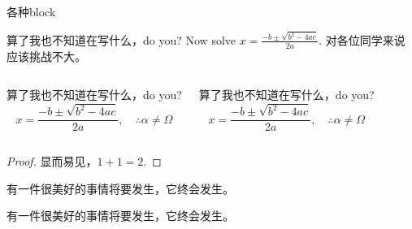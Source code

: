 \documentclass[aspectratio=1610,linespread=1.4,t]{ctexbeamer}
\begin{document}

\begin{frame}[allowframebreaks]{各种block}
    
    \begin{exampleblock}{算了我也不知道在写什么，do you?}
    Now solve $x = \frac{-b \pm \sqrt{b^2 -4ac}}{2a}$. 对各位同学来说应该挑战不大。
    \end{exampleblock}

\begin{columns}[T]
    \begin{alertblock}{算了我也不知道在写什么，do you?}
    \[ x = \frac{-b \pm \sqrt{b^2 -4ac}}{2a}, \quad\therefore \alpha \neq \Omega \]
    \end{alertblock}
    
    \begin{block}{算了我也不知道在写什么，do you?}
    \[ x = \frac{-b \pm \sqrt{b^2 -4ac}}{2a}, \quad\therefore \alpha \neq \Omega \]
    \end{block}
\end{columns}
    
    \begin{proof}
    显而易见，$1+1=2$.
    \end{proof}

    \begin{theorem}
    有一件很美好的事情将要发生，它终会发生。
    \end{theorem}
    
    \begin{definition}
    有一件很美好的事情将要发生，它终会发生。
    \end{definition}
\end{frame}
\end{document}
